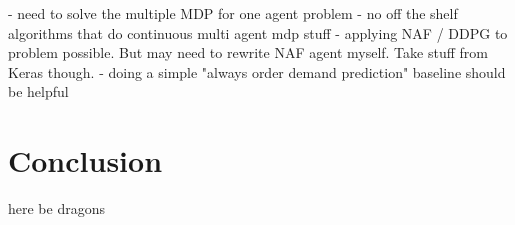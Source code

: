 
- need to solve the multiple \ac{MDP} for one agent problem
- no off the shelf algorithms that do continuous multi agent mdp stuff
- applying \ac{NAF} / \ac{DDPG} to problem possible. But may need to rewrite \ac{NAF} agent myself. Take stuff from
Keras though. 
- doing a simple "always order demand prediction" baseline should be helpful
\chapter{Conclusion}%
\label{cha:conclusion}

here be dragons
